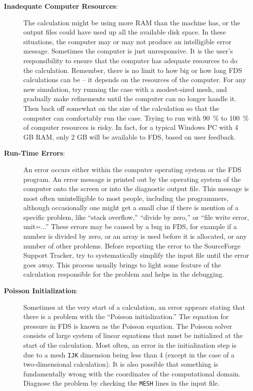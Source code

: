 \documentclass[11pt]{book}
\newcommand{\ct}{\tt\small}
\begin{document}
\begin{description}
\item[{\bf Inadequate Computer Resources}:] 
The calculation might be using more RAM than the machine
has, or the output files could have used up all the available disk space. In these situations, the
computer may or may not produce an intelligible error message. Sometimes the computer is just
unresponsive. It is the user's responsibility to ensure that the computer has adequate resources to
do the calculation. Remember, there is no limit to how big or how long FDS calculations can be -- it
depends on the resources of the computer. For any new simulation, try running the case with a modest-sized mesh,
and gradually make refinements until the computer can no longer handle it. Then back off
somewhat on the size of the calculation so that the computer can comfortably run the
case. Trying to run with 90~\% to 100~\% of computer resources is risky.
In fact, for a typical Windows PC with 4 GB RAM, only 2 GB will be available to FDS, based on user feedback.

\item[{\bf Run-Time Errors}:] 
An error occurs either within the computer operating system or the
FDS program. An error message is printed out by the operating system of
the computer onto the screen or into the diagnostic output file. This
message is most often unintelligible to most people, including the programmers,
although occasionally one might get a small clue if there is mention of a specific problem,
like ``stack overflow,'' ``divide by zero,'' or ``file write error, unit=...''
These errors may be caused by a bug in FDS, for example if a number is divided by zero,
or an array is used before it is allocated, or any number of other problems.
Before reporting the error to the SourceForge Support Tracker, try to systematically simplify the
input file until the error goes away. This process usually brings to light some feature of the
calculation responsible for the problem and helps in the debugging.

\item[{\bf Poisson Initialization}:] 
Sometimes at the very start of a calculation, an error
appears stating that there is a problem with the ``Poisson initialization.'' The equation for
pressure in FDS is known as the Poisson equation. The Poisson solver consists of large system
of linear equations that must be initialized at the start of the calculation.
Most often, an error in the initialization step is due to a mesh {\ct IJK} dimension
being less than 4 (except in the case of a two-dimensional calculation). It is also possible that something is
fundamentally wrong with the coordinates of the computational domain. Diagnose the problem by
checking the {\ct MESH} lines in the input file.
\end{description}
\end{document}
